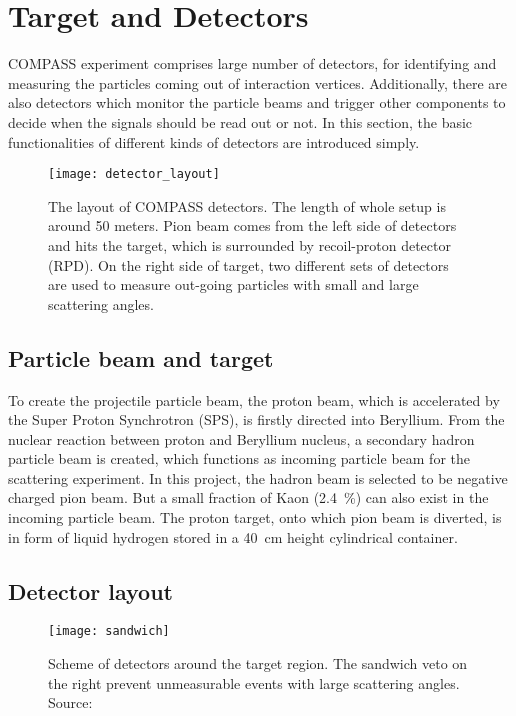 \section{Target and Detectors}
COMPASS experiment comprises large number of detectors, for identifying and measuring the particles coming out of interaction vertices. Additionally, there are also detectors which monitor the particle beams and trigger other components to decide when the signals should be read out or not. In this section, the basic functionalities of different kinds of detectors are introduced simply. 

\begin{figure*}[!ht]
	\centering
	\texttt{[image: detector\_layout]}
	\caption{The layout of COMPASS detectors. The length of whole setup is around 50 meters. Pion beam comes from the left side of detectors and hits the target, which is surrounded by recoil-proton detector (RPD). On the right side of target, two different sets of detectors are used to measure out-going particles with small and large scattering angles.}
	\label{fig:detec_layout}	
\end{figure*}

\subsection{Particle beam and target}
To create the projectile particle beam, the proton beam, which is accelerated by the Super Proton Synchrotron (SPS), is firstly directed into Beryllium. From the nuclear reaction between proton and Beryllium nucleus, a secondary hadron particle beam is created, which functions as incoming particle beam for the scattering experiment. In this project, the hadron beam is selected to be negative charged pion beam. But a small fraction of Kaon (\SI{2.4}{\percent}) can also exist in the incoming particle beam. The proton target, onto which pion beam is diverted, is in form of liquid hydrogen stored in a \SI{40}{\centi\meter} height cylindrical container. 

\subsection{Detector layout}
\label{subsec:Detector_layout}
\begin{figure}[!th]
	\centering
	\texttt{[image: sandwich]}
	\caption{Scheme of detectors around the target region. The sandwich veto on the right prevent unmeasurable events with large scattering angles. Source: \cite{sandwich}}
	\label{fig:sandwich}
\end{figure}

